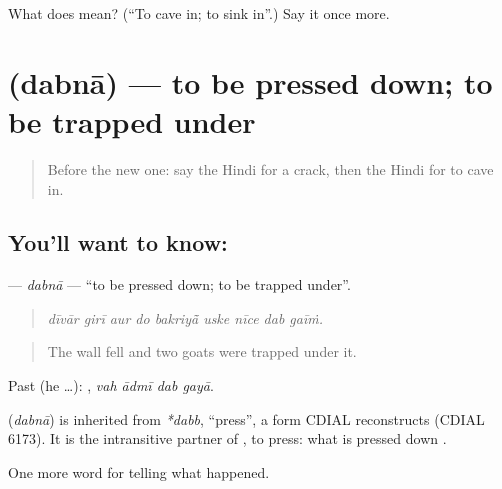\begin{tcolorbox}[breakable,colback=teal!4,colframe=teal!35!black,title={Before you move on}]
What does  mean? (\textquotedblleft{}To cave in; to sink in\textquotedblright{}.) Say it once more.
\end{tcolorbox}
\section[\texorpdfstring{\hi{दबना} (dabnā)}{दबना (dabnā)}]{ (dabnā) — to be pressed down; to be trapped under}

\label{lesson:HI-C303-dabna}



\begin{quote}
Before the new one: say the Hindi for a crack, then the Hindi for to cave in.
\end{quote}

\subsection*{You'll want to know: }
\textbf{} — \emph{dabnā} — \textquotedblleft{}to be pressed down; to be trapped under\textquotedblright{}.

\begin{quote}
        
\end{quote}

\begin{quote}
\emph{dīvār girī aur do bakriyā̃ uske nīce dab gaīṁ.}
\end{quote}

\begin{quote}
The wall fell and two goats were trapped under it.
\end{quote}

Past (he …):    , \emph{vah ādmī dab gayā}.

\begin{cousinweb}
\textbf{} (\emph{dabnā}) is inherited from \emph{*dabb}, \textquotedblleft{}press\textquotedblright{}, a form CDIAL reconstructs (CDIAL 6173). It is the intransitive partner of \textbf{}, to press: what is pressed down \textbf{ }.
\end{cousinweb}

\begin{grammarlens}[title={What you've built}]
One more word for telling what happened.
\end{grammarlens}

